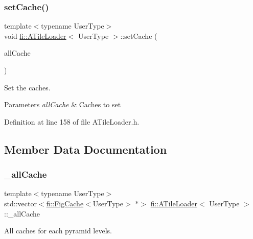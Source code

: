 \subsubsection{\texorpdfstring{set\+Cache()}{setCache()}}
{\footnotesize\ttfamily template$<$typename User\+Type$>$ \\
void \hyperlink{classfi_1_1ATileLoader}{fi\+::\+A\+Tile\+Loader}$<$ User\+Type $>$\+::set\+Cache (\begin{DoxyParamCaption}\item[{std\+::vector$<$ \hyperlink{classfi_1_1FigCache}{fi\+::\+Fig\+Cache}$<$ User\+Type $>$ $\ast$$>$ \&}]{all\+Cache }\end{DoxyParamCaption})\hspace{0.3cm}{\ttfamily [inline]}}



Set the caches. 


\begin{DoxyParams}{Parameters}
{\em all\+Cache} & Caches to set \\
\hline
\end{DoxyParams}


Definition at line 158 of file A\+Tile\+Loader.\+h.



\subsection{Member Data Documentation}
\mbox{\label{classfi_1_1ATileLoader_a07679e26c08c1f998e00cdf3e1af5d43}} 
\subsubsection{\texorpdfstring{\+\_\+all\+Cache}{\_allCache}}
{\footnotesize\ttfamily template$<$typename User\+Type$>$ \\
std\+::vector$<$\hyperlink{classfi_1_1FigCache}{fi\+::\+Fig\+Cache}$<$User\+Type$>$ $\ast$$>$ \hyperlink{classfi_1_1ATileLoader}{fi\+::\+A\+Tile\+Loader}$<$ User\+Type $>$\+::\+\_\+all\+Cache\hspace{0.3cm}{\ttfamily [private]}}



All caches for each pyramid levels. 



